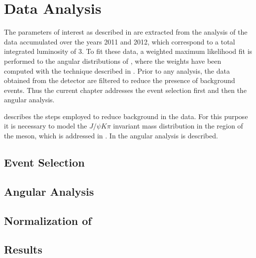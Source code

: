 \chapter{Data Analysis}
\label{Data_Analysis}

The parameters of interest as described in  are extracted from the analysis of the
\runone \lhcb data accumulated over the years 2011 and 2012, which correspond to a total integrated luminosity
of 3\invfb. To fit these data, a weighted maximum likelihood fit is performed to the angular distributions of \BsJpsiKst,
where the weights have been computed with the \sPlot technique \cite{splot} described in .
Prior to any analysis, the data obtained from the detector are filtered to reduce the presence of
background events. Thus the current chapter addresses the event selection first and then the angular analysis.

 describes the steps employed to reduce background in the data. For this purpose
it is necessary to model the $J/\psi K\pi$ invariant mass distribution in the region of the \Bs meson, which
is addressed in . In  the angular analysis is described.\\

\section{Event Selection}
\label{Event_Selection}


\section{Angular Analysis}
\label{Angular_Analysis}


\section{Normalization of \BsJpsiKpi}
\label{Normalization}


\section{Results}
\label{Results}

